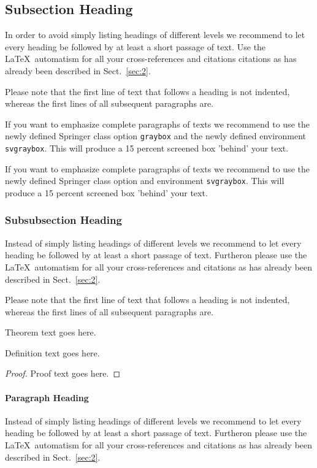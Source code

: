 \subsection{Subsection Heading} %
In order to avoid simply listing headings of different levels we recommend to let every heading be followed by at least a short passage of text. Use the \LaTeX\ automatism for all your cross-references and citations citations as has already been described in Sect.~\ref{sec:2}.

Please note that the first line of text that follows a heading is not indented, whereas the first lines of all subsequent paragraphs are.

\begin{svgraybox}
If you want to emphasize complete paragraphs of texts we recommend to use the newly defined Springer class option \verb|graybox| and the newly defined environment \verb|svgraybox|. This will produce a 15 percent screened box 'behind' your text.

If you want to emphasize complete paragraphs of texts we recommend to use the newly defined Springer class option and environment \verb|svgraybox|. This will produce a 15 percent screened box 'behind' your text.
\end{svgraybox}


\subsubsection{Subsubsection Heading}
Instead of simply listing headings of different levels we recommend to let every heading be followed by at least a short passage of text. Furtheron please use the \LaTeX\ automatism for all your cross-references and citations as has already been described in Sect.~\ref{sec:2}.

Please note that the first line of text that follows a heading is not indented, whereas the first lines of all subsequent paragraphs are.

\begin{theorem}
Theorem text goes here.
\end{theorem}
%
%
\begin{definition}
Definition text goes here.
\end{definition}

\begin{proof}
Proof text goes here.
\end{proof}

\paragraph{Paragraph Heading} %
Instead of simply listing headings of different levels we recommend to let every heading be followed by at least a short passage of text. Furtheron please use the \LaTeX\ automatism for all your cross-references and citations as has already been described in Sect.~\ref{sec:2}.

